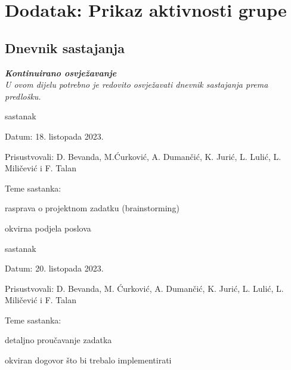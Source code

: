 \chapter*{Dodatak: Prikaz aktivnosti grupe}
		
		\section*{Dnevnik sastajanja}
		
		\textbf{\textit{Kontinuirano osvježavanje}}\\
		
		 \textit{U ovom dijelu potrebno je redovito osvježavati dnevnik sastajanja prema predlošku.}
		
		\begin{packed_enum}
			\item  sastanak
			
			\item[] \begin{packed_item}
				\item Datum: 18. listopada 2023.
				\item Prisustvovali: D. Bevanda, M.Ćurković, A. Dumančić, K. Jurić, L. Lulić, L. Miličević i F. Talan
				\item Teme sastanka:
				\begin{packed_item}
					\item  rasprava o projektnom zadatku (brainstorming)
					\item  okvirna podjela poslova
				\end{packed_item}
			\end{packed_item}
			
			\item  sastanak
			\item[] \begin{packed_item}
				\item Datum: 20. listopada 2023.
				\item Prisustvovali: D. Bevanda, M. Ćurković, A. Dumančić, K. Jurić, L. Lulić, L. Miličević i F. Talan
				\item Teme sastanka:
				\begin{packed_item}
					\item  detaljno proučavanje zadatka
					\item  okviran dogovor što bi trebalo implementirati
				\end{packed_item}
			\end{packed_item}


\end{packed_enum}
